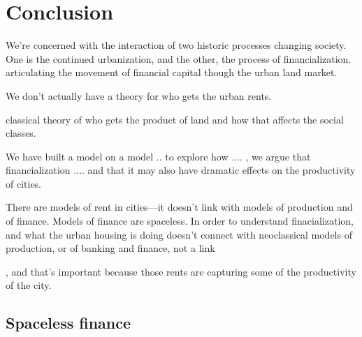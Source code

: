 \chapter{Conclusion} \label{chapter-conclusions}


We're concerned with the interaction of two historic processes changing society. One is the continued urbanization, and the other, the process of financialization. 
articulating the movement of financial capital though the urban land market. 

We don't actually have a theory for who gets the urban rents. 


 classical theory of who gets the product of land and how that affects the social classes.

We have built a model  on a model ..  to explore how .... , we argue that financialization .... and that it may also have dramatic effects on the productivity of cities.

There are models of rent in cities---it doesn't link with models of production and of finance.  Models of finance are spaceless.  In order to understand finacialization, and what the urban housing is doing doesn't connect with neoclassical models of production, or of banking and finance, not a link


, and that's important because those rents are capturing some of the productivity of the city. 

\section{Spaceless finance}

